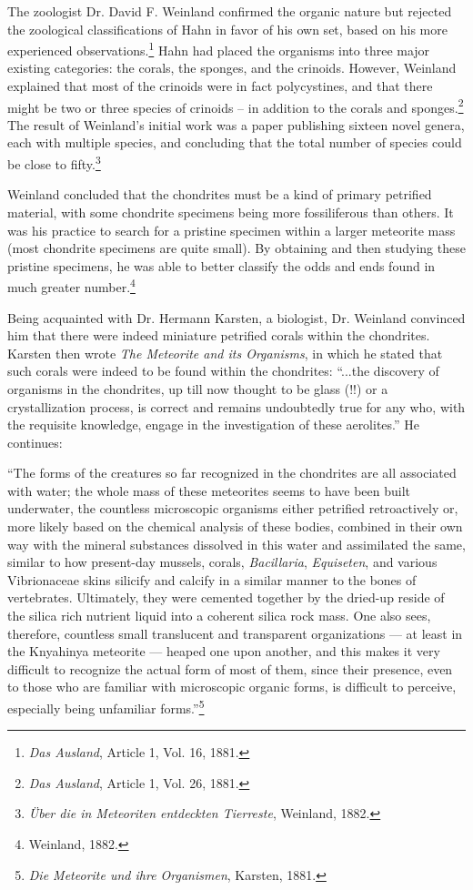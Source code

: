 \documentclass[a4paper, 12pt, oneside]{article}
\begin{document}
The zoologist Dr. David F. Weinland confirmed the organic nature but rejected the zoological classifications of Hahn in favor of his own set, based on his more experienced observations.\footnote{\emph{Das Ausland}, Article 1, Vol. 16, 1881.} Hahn had placed the organisms into three major existing categories: the corals, the sponges, and the crinoids. However, Weinland explained that most of the crinoids were in fact polycystines, and that there might be two or three species of crinoids -- in addition to the corals and sponges.\footnote{\emph{Das Ausland}, Article 1, Vol. 26, 1881.} The result of Weinland's initial work was a paper publishing sixteen novel genera, each with multiple species, and concluding that the total number of species could be close to fifty.\footnote{\emph{Über die in Meteoriten entdeckten Tierreste}, Weinland, 1882.}

Weinland concluded that the chondrites must be a kind of primary petrified material, with some chondrite specimens being more fossiliferous than others. It was his practice to search for a pristine specimen within a larger meteorite mass (most chondrite specimens are quite small). By obtaining and then studying these pristine specimens, he was able to better classify the odds and ends found in much greater number.\footnote{Weinland, 1882.}

Being acquainted with Dr. Hermann Karsten, a biologist, Dr. Weinland convinced him that there were indeed miniature petrified corals within the chondrites. Karsten then wrote \emph{The Meteorite and its Organisms}, in which he stated that such corals were indeed to be found within the chondrites: ``...the discovery of organisms in the chondrites, up till now thought to be glass (!!) or a crystallization process, is correct and remains undoubtedly true for any who, with the requisite knowledge, engage in the investigation of these aerolites.'' He continues:
\begin{displayquote}
``The forms of the creatures so far recognized in the chondrites are all associated with water; the whole mass of these meteorites seems to have been built underwater, the countless microscopic organisms either petrified retroactively or, more likely based on the chemical analysis of these bodies, combined in their own way with the mineral substances dissolved in this water and assimilated the same, similar to how present-day mussels, corals, \emph{Bacillaria}, \emph{Equiseten}, and various Vibrionaceae skins silicify and calcify in a similar manner to the bones of vertebrates. Ultimately, they were cemented together by the dried-up reside of the silica rich nutrient liquid into a coherent silica rock mass. One also sees, therefore, countless small translucent and transparent organizations --- at least in the Knyahinya meteorite --- heaped one upon another, and this makes it very difficult to recognize the actual form of most of them, since their presence, even to those who are familiar with microscopic organic forms, is difficult to perceive, especially being unfamiliar forms.''\footnote{\emph{Die Meteorite und ihre Organismen}, Karsten, 1881.}
\end{displayquote}
\end{document}
